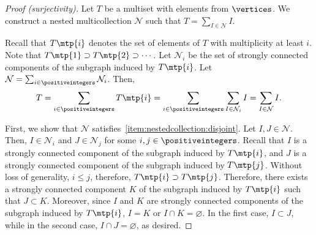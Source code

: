 \begin{proof}[Proof (surjectivity)]
    Let \(T\) be a multiset with elements from \(\vertices\).
    We construct a nested multicollection \(\mathcal{N}\) such that \(T = \sum_{I \in \mathcal{N}} I\).

    Recall that \(T\mtp{i}\) denotes the set of elements of \(T\) with multiplicity at least \(i\).
    Note that \(T\mtp{1} \supset T\mtp{2} \supset \cdots\).
    Let \(\mathcal{N}_i\) be the set of strongly connected components of the subgraph induced by \(T\mtp{i}\).
    Let \(\mathcal{N} = \sum_{i \in \positiveintegers} \mathcal{N}_i\).
    Then, 
    \begin{equation*}
		T = \sum_{i \in \positiveintegers} T\mtp{i} = \sum_{i \in \positiveintegers} \sum_{I \in \mathcal{N}_i} I = \sum_{I \in \mathcal{N}} I.
	\end{equation*}

    First, we show that \(\mathcal{N}\) satisfies~\ref{item:nestedcollection:disjoint}.
    Let \(I, J \in \mathcal{N}\).
    Then, \(I \in \mathcal{N}_i\) and \(J \in \mathcal{N}_j\) for some \(i, j \in \positiveintegers\).
    Recall that \(I\) is a strongly connected component of the subgraph induced by \(T\mtp{i}\), and \(J\) is a strongly connected component of the subgraph induced by \(T\mtp{j}\).
    Without loss of generality, \(i \leq j\), therefore, \(T\mtp{i} \supset T\mtp{j}\).
    Therefore, there exists a strongly connected component \(K\) of the subgraph induced by \(T\mtp{i}\) such that \(J \subset K\).
    Moreover, since \(I\) and \(K\) are strongly connected components of the subgraph induced by \(T\mtp{i}\), \(I = K\) or \(I \cap K = \varnothing\).
    In the first case, \(I \subset J\), 
    while in the second case, \(I \cap J = \varnothing\),
    as desired.


\end{proof}

